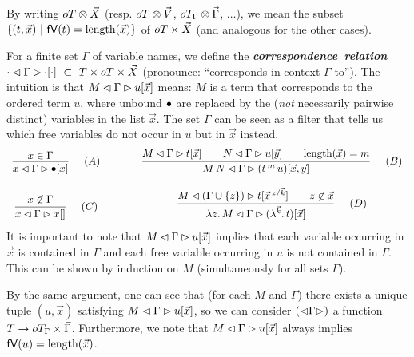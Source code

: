 \documentclass[submission,copyright,creativecommons]{eptcs}
\newcommand{\define}[1]{\mbox{\textbf{\textit{#1}}}}
\begin{document}
By writing $oT \otimes \vec {X}$ (resp. $oT \otimes \vec {V}$, $oT_\Gamma \otimes \vec \Gamma$, $\ldots$), we mean the subset $\{(t, \vec x) \ | \ \freevars t = \length {\vec x} \}$ of $oT \times \vec {X}$ (and analogous for the other cases).

For a finite %
set $\Gamma$ of variable names, we define the \define{correspondence relation}
${{\cdot \lhd \Gamma \rhd \cdot[\cdot]} ~ \subset ~ T \times oT \times
  \vec {X}}$
(pronounce: ``corresponds in context $\Gamma$ to'').
The intuition is that ${{M \lhd \Gamma \rhd u[\vec x]}}$ means: 
$M$ is a term that corresponds to the ordered term $u$, where unbound
$\mathord{\bullet}$ are replaced by the (\emph{not} necessarily pairwise distinct)
variables in the list $\vec x$. 
The set $\Gamma$ can be seen as a filter that tells us which free variables do not occur in $u$ but in $\vec x$ instead.
\[
\begin{array}{c@{\qquad\qquad} c}
\infnamed{\quad (A)}{x \in \Gamma}{\parseb x \Gamma \ovar x}
&
\infnamed{\quad (B)}{ {\parseb M \Gamma t {\vec x}} \qquad 
        {\parseb N \Gamma u {\vec y}} \qquad {\length{\vec x} = m} } 
      {\parseb {M\,N} {\Gamma} {(\ApO t m u)}  {\vec x, \vec y} } 
\\ \\
\infnamed{\quad (C)}{x \not\in \Gamma}{\parseb x \Gamma x {}}
&
\infnamed{\quad (D)}{ 
         {\parseb M { (\Gamma \cup \{z\}) }  t {\multiinsert{\vec x}{\vec k}{z}   }} 
          \qquad 
          z \not\in \vec x  }
          {\parseb {\LaA z M} {\Gamma} {(\LaO {\vec{k}} t)} {\vec x}}
\end{array}
\]
It is important to note that ${M \lhd \Gamma \rhd u[\vec x]}$ implies that each variable occurring in $\vec x$ is contained in $\Gamma$ and each free variable occurring in $u$ is not contained in $\Gamma$. This can be shown by induction on $M$ (simultaneously for all sets $\Gamma$). 

By the same argument, one can see that (for each $M$ and $\Gamma$) there exists a unique tuple $(u, \vec x)$ satisfying ${M \lhd \Gamma \rhd u[\vec x]}$, so we can consider ${\left(\mathord{\lhd} {\Gamma} \mathord{\rhd}\right)}$ a function $T \rightarrow oT_\Gamma \times \vec \Gamma$. Furthermore, we note that ${M \lhd \Gamma \rhd u[\vec x]}$ always implies $\mathsf{fV}(u) = \mbox{length}(\vec x)$. 
 
\end{document}

